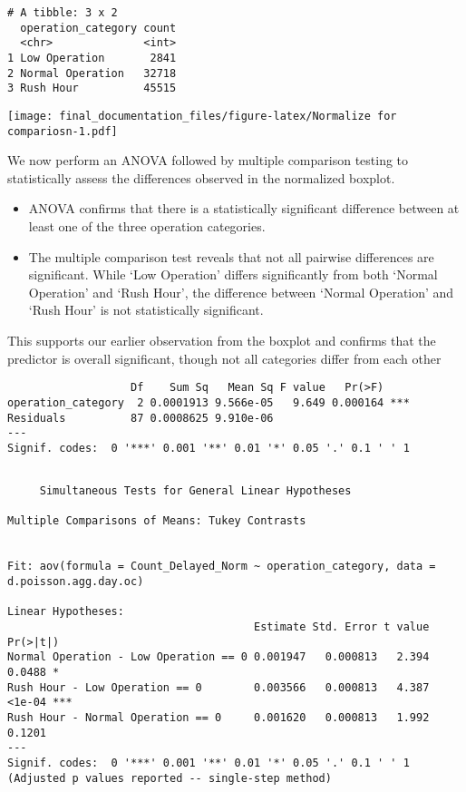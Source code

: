 \documentclass[
]{article}
\begin{document}
\begin{verbatim}
# A tibble: 3 x 2
  operation_category count
  <chr>              <int>
1 Low Operation       2841
2 Normal Operation   32718
3 Rush Hour          45515
\end{verbatim}

\texttt{[image: final\_documentation\_files/figure-latex/Normalize for compariosn-1.pdf]}

We now perform an ANOVA followed by multiple comparison testing to
statistically assess the differences observed in the normalized boxplot.

\begin{itemize}
\item
  ANOVA confirms that there is a statistically significant difference
  between at least one of the three operation categories.
\item
  The multiple comparison test reveals that not all pairwise differences
  are significant. While `Low Operation' differs significantly from both
  `Normal Operation' and `Rush Hour', the difference between `Normal
  Operation' and `Rush Hour' is not statistically significant.
\end{itemize}

This supports our earlier observation from the boxplot and confirms that
the predictor is overall significant, though not all categories differ
from each other

\begin{verbatim}
                   Df    Sum Sq   Mean Sq F value   Pr(>F)    
operation_category  2 0.0001913 9.566e-05   9.649 0.000164 ***
Residuals          87 0.0008625 9.910e-06                     
---
Signif. codes:  0 '***' 0.001 '**' 0.01 '*' 0.05 '.' 0.1 ' ' 1
\end{verbatim}

\begin{verbatim}

     Simultaneous Tests for General Linear Hypotheses

Multiple Comparisons of Means: Tukey Contrasts


Fit: aov(formula = Count_Delayed_Norm ~ operation_category, data = d.poisson.agg.day.oc)

Linear Hypotheses:
                                      Estimate Std. Error t value Pr(>|t|)    
Normal Operation - Low Operation == 0 0.001947   0.000813   2.394   0.0488 *  
Rush Hour - Low Operation == 0        0.003566   0.000813   4.387   <1e-04 ***
Rush Hour - Normal Operation == 0     0.001620   0.000813   1.992   0.1201    
---
Signif. codes:  0 '***' 0.001 '**' 0.01 '*' 0.05 '.' 0.1 ' ' 1
(Adjusted p values reported -- single-step method)
\end{verbatim}
\end{document}
